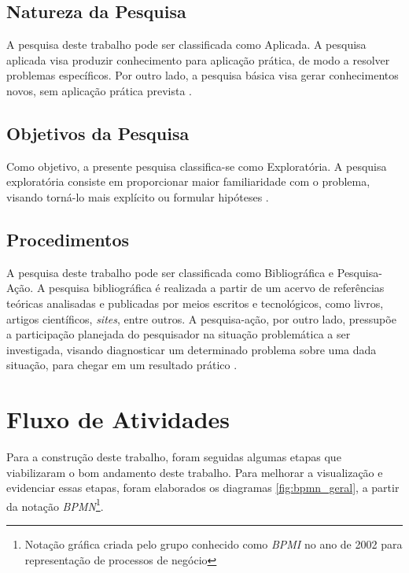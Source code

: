 \subsection{Natureza da Pesquisa}
A pesquisa deste trabalho pode ser classificada como Aplicada. A pesquisa aplicada visa produzir conhecimento para aplicação prática, de modo a resolver problemas específicos. Por outro lado, a pesquisa básica visa gerar conhecimentos novos, sem aplicação prática prevista \cite{gerhardt2009metodos}.

\subsection{Objetivos da Pesquisa}
Como objetivo, a presente pesquisa classifica-se como Exploratória. A pesquisa exploratória consiste em proporcionar maior familiaridade com o problema, visando torná-lo mais explícito ou formular hipóteses \cite{gil2002elaborar}.

\subsection{Procedimentos}
A pesquisa deste trabalho pode ser classificada como Bibliográfica e Pesquisa-Ação. A pesquisa bibliográfica é realizada a partir de um acervo de referências teóricas analisadas e publicadas por meios escritos e tecnológicos, como livros, artigos científicos, \textit{sites}, entre outros. A pesquisa-ação, por outro lado, pressupõe a participação planejada do pesquisador na situação problemática a ser investigada, visando diagnosticar um determinado problema sobre uma dada situação, para chegar em um resultado prático \cite{gil2002elaborar}.

\section{Fluxo de Atividades}

\label{sec:fluxo_atividade}
    
Para a construção deste trabalho, foram seguidas algumas etapas que viabilizaram o bom andamento deste trabalho. Para melhorar a visualização e evidenciar essas etapas, foram elaborados os diagramas \ref{fig:bpmn_geral}, a partir da notação \textit{BPMN}\footnote{Notação gráfica criada pelo grupo conhecido como \textit{BPMI} no ano de 2002 para representação de processos de negócio}.

